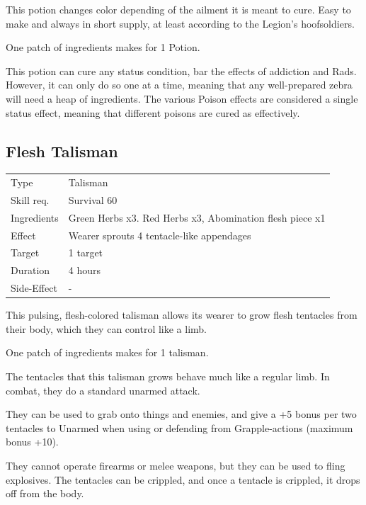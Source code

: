 \documentclass[11pt,a4paper,twocolumn]{book}
\begin{document}
\medskip

This potion changes color depending of the ailment it is meant to cure. Easy to make and always in short supply, at least according to the Legion's hoofsoldiers.

One patch of ingredients makes for 1 Potion.

This potion can cure any status condition, bar the effects of addiction and Rads. However, it can only do so one at a time, meaning that any well-prepared zebra will need a heap of ingredients.
The various Poison effects are considered a single status effect, meaning that different poisons are cured as effectively.


\subsection*{Flesh Talisman}
{
	\begin{tabu} to 75mm{| X[l,4] | X[l,8] |}
		\hline
		Type 			& Talisman													\\
        Skill req.	    & Survival 60 												\\
        Ingredients     & Green Herbs x3. Red Herbs x3, Abomination flesh piece x1	\\
        Effect     		& Wearer sprouts 4 tentacle-like appendages					\\
        Target      	& 1 target													\\
        Duration  		& 4 hours	 												\\
        Side-Effect     & -															\\ \hline
	\end{tabu}
		
}

\medskip

This pulsing, flesh-colored talisman allows its wearer to grow flesh tentacles from their body, which they can control like a limb.

One patch of ingredients makes for 1 talisman.

The tentacles that this talisman grows behave much like a regular limb. In combat, they do a standard unarmed attack.

They can be used to grab onto things and enemies, and give a +5 bonus per two tentacles to Unarmed when using or defending from Grapple-actions (maximum bonus +10).

They cannot operate firearms or melee weapons, but they can be used to fling explosives. The tentacles can be crippled, and once a tentacle is crippled, it drops off from the body.
\end{document}
